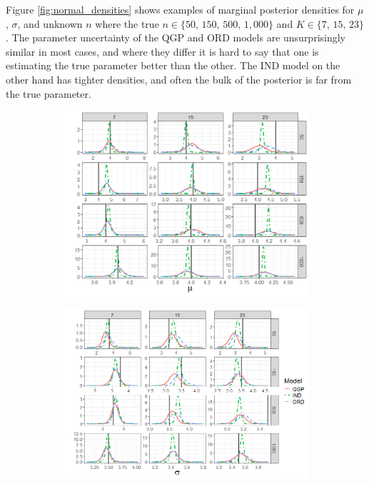 \documentclass[preprint,12pt,authoryear]{elsarticle}
\begin{document}
Figure \ref{fig:normal_densities} shows examples of marginal posterior densities for $\mu$, $\sigma$, and unknown $n$ where the true $n \in \{50,\,150,\,500,\,1,000\}$ and $K \in \{7,\,15,\,23\}$. 
The parameter uncertainty of the QGP and ORD models are unsurprisingly similar in most cases, and where they differ it is hard to say that one is estimating the true parameter better than the other. The IND model on the other hand has tighter densities, and often the bulk of the posterior is far from the true parameter.
\begin{figure}[ht!]
\begin{subfigure}{.475\linewidth}
  \includegraphics[width=\linewidth]{Images/normal_mean_fit.png}
\end{subfigure}\hfill %
\begin{subfigure}{.52\linewidth}
  \includegraphics[width=\linewidth]{Images/normal_sd_fit.png}
\end{subfigure}


\end{figure}
\end{document}
